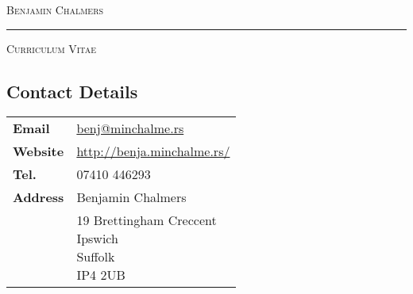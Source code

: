 \documentclass[9pt,a4paper]{article}
\begin{document}
\begin{center}

  \textsc{\Huge{Benjamin Chalmers}}
  \vspace{0.3cm}

  \noindent\rule{0.8\textwidth}{0.4pt}
  \vspace{0.3cm}

  \textsc{\large{Curriculum Vitae}}
  \vspace{0.2cm}

\end{center}
\begin{multicols*}{2}
  \section*{Contact Details} 
\begin{center}
  \begin{tabular}{p{2cm}p{6cm}}
    \textbf{Email}&\href{mailto:benj@minchalme.rs}{benj@minchalme.rs}\\
    \textbf{Website}&\href{http://benja.minchalme.rs/}{http://benja.minchalme.rs/}\\
    \textbf{Tel.}&07410 446293\\
    \textbf{Address}&Benjamin Chalmers\\
    &\parbox{5cm}{19 Brettingham Creccent\\Ipswich\\Suffolk\\IP4 2UB}\\
  \end{tabular}
\end{center}


\end{multicols*}
\end{document}
